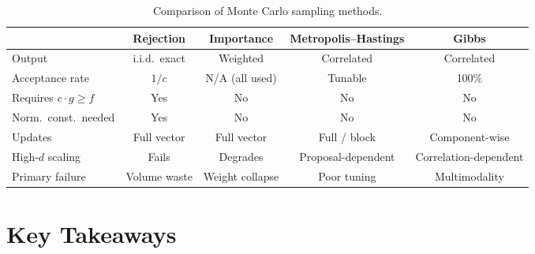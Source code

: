\documentclass[11pt]{article}
\begin{document}
\begin{table}[H]
\centering\small
\begin{tabular}{lcccc}
\toprule
& \textbf{Rejection} & \textbf{Importance} & \textbf{Metropolis--Hastings} & \textbf{Gibbs} \\
\midrule
Output & i.i.d.\ exact & Weighted & Correlated & Correlated \\
Acceptance rate & $1/c$ & N/A (all used) & Tunable & 100\% \\
Requires $c \cdot g \ge f$ & Yes & No & No & No \\
Norm.\ const.\ needed & Yes & No & No & No \\
Updates & Full vector & Full vector & Full / block & Component-wise \\
High-$d$ scaling & Fails & Degrades & Proposal-dependent & Correlation-dependent \\
Primary failure & Volume waste & Weight collapse & Poor tuning & Multimodality \\
\bottomrule
\end{tabular}
\caption{Comparison of Monte Carlo sampling methods.}
\label{tab:compare}
\end{table}

\section{Key Takeaways}
\end{document}
